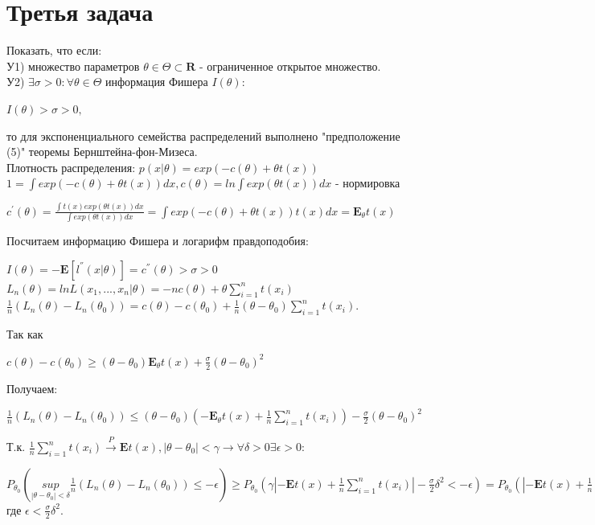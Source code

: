 \documentclass{article}
\begin{document}
\section{Третья задача}
Показать, что если:\\
У1) множество параметров $\theta \in \Theta \subset \mathbf{R}$ - ограниченное открытое множество.\\
У2) $\exists \sigma > 0 : \forall \theta \in \Theta$ информация Фишера $I(\theta)$:
\begin{center}
$I(\theta) > \sigma > 0,$
\end{center}
то для экспоненциального семейства распределений выполнено "предположение (5)" теоремы Бернштейна-фон-Мизеса.\\
Плотность распределения: $p(x|\theta) = exp(-c(\theta) + \theta t(x))$\\
$1 = \int exp(-c(\theta) + \theta t(x))dx, c(\theta) = ln \int exp(\theta t(x))dx$ - нормировка
\begin{center}
$c^{'}(\theta) = \frac{\int t(x)exp(\theta t(x))dx}{\int exp(\theta t(x))dx} = \int exp(-c(\theta) + \theta t(x))t(x)dx = \mathbf{E}_{\theta} t(x)$
\end{center}
Посчитаем информацию Фишера и логарифм правдоподобия:
\begin{center}
$I(\theta) = - \mathbf{E}[l^{''}(x|\theta)] = c^{''}(\theta) > \sigma > 0$\\
$L_n(\theta) = ln L(x_1,...,x_n|\theta) = -nc(\theta) + \theta \sum\limits_{i=1}^{n}t(x_i)$\\
$\frac{1}{n}(L_n(\theta) - L_n(\theta_0)) = c(\theta) - c(\theta_0) + \frac{1}{n}(\theta - \theta_0)\sum\limits_{i=1}^{n}t(x_i).$
\end{center}
Так как
\begin{center}
$c(\theta) - c(\theta_0) \geq (\theta - \theta_0)\mathbf{E}_{\theta}t(x) + \frac{\sigma}{2}(\theta - \theta_0)^2$
\end{center}
Получаем:
\begin{center}
$\frac{1}{n}(L_n(\theta) - L_n(\theta_0)) \leq (\theta - \theta_0)(-\mathbf{E}_{\theta}t(x) + \frac{1}{n}\sum\limits_{i=1}^n t(x_i)) - \frac{\sigma}{2}(\theta - \theta_0)^2$
\end{center}
Т.к. $\frac{1}{n}\sum\limits_{i=1}^n t(x_i) \overset{P}{\to} \mathbf{E}t(x), |\theta - \theta_0| < \gamma \to \forall \delta > 0 \exists \epsilon > 0 :$
\begin{center}
$P_{\theta_0}(\underset{|\theta - \theta_0 | < \delta}{sup}\frac{1}{n}(L_n(\theta) - L_n(\theta_0)) \leq -\epsilon) \geq P_{\theta_0}(\gamma|-\mathbf{E}t(x) + \frac{1}{n}\sum\limits_{i=1}^n t(x_i)| - \frac{\sigma}{2}\delta^2 < -\epsilon) = P_{\theta_0}(|-\mathbf{E}t(x) + \frac{1}{n}\sum\limits_{i=1}^n t(x_i)| < \frac{1}{\gamma}(\frac{\sigma}{2}\delta^2 - \epsilon)) \to 1,$ где $\epsilon < \frac{\sigma}{2}\delta^2$.
\end{center}
\end{document}
